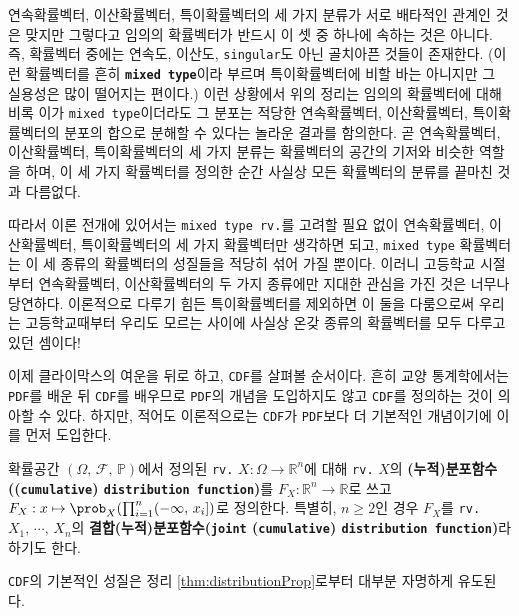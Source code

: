 연속확률벡터, 이산확률벡터, 특이확률벡터의 세 가지 분류가 서로 배타적인 관계인 것은 맞지만 그렇다고 임의의 확률벡터가 반드시 이 셋 중 하나에 속하는 것은 아니다. 즉, 확률벡터 중에는 연속도, 이산도, \texttt{singular}도 아닌 골치아픈 것들이 존재한다. (이런 확률벡터를 흔히 \textbf{\texttt{mixed type}}이라 부르며 특이확률벡터에 비할 바는 아니지만 그 실용성은 많이 떨어지는 편이다.) 이런 상황에서 위의 정리는 임의의 확률벡터에 대해 비록 이가 \texttt{mixed type}이더라도 그 분포는 적당한 연속확률벡터, 이산확률벡터, 특이확률벡터의 분포의 합으로 분해할 수 있다는 놀라운 결과를 함의한다. 곧 연속확률벡터, 이산확률벡터, 특이확률벡터의 세 가지 분류는 확률벡터의 공간의 기저와 비슷한 역할을 하며, 이 세 가지 확률벡터를 정의한 순간 사실상 모든 확률벡터의 분류를 끝마친 것과 다름없다.

따라서 이론 전개에 있어서는 \texttt{mixed type rv.}를 고려할 필요 없이 연속확률벡터, 이산확률벡터, 특이확률벡터의 세 가지 확률벡터만 생각하면 되고, \texttt{mixed type} 확률벡터는 이 세 종류의 확률벡터의 성질들을 적당히 섞어 가질 뿐이다. 이러니 고등학교 시절부터 연속확률벡터, 이산확률벡터의 두 가지 종류에만 지대한 관심을 가진 것은 너무나 당연하다. 이론적으로 다루기 힘든 특이확률벡터를 제외하면 이 둘을 다룸으로써 우리는 고등학교때부터 우리도 모르는 사이에 사실상 온갖 종류의 확률벡터를 모두 다루고 있던 셈이다!

이제 클라이막스의 여운을 뒤로 하고, \texttt{CDF}를 살펴볼 순서이다. 흔히 교양 통계학에서는 \texttt{PDF}를 배운 뒤 \texttt{CDF}를 배우므로 \texttt{PDF}의 개념을 도입하지도 않고 \texttt{CDF}를 정의하는 것이 의아할 수 있다. 하지만, 적어도 이론적으로는 \texttt{CDF}가 \texttt{PDF}보다 더 기본적인 개념이기에 이를 먼저 도입한다.

\begin{definition}
    확률공간 $(\Omega,\,\mathcal{F},\,\mathbb{P})$에서 정의된 \texttt{rv.} $X:\Omega\to\mathbb{R}^n$에 대해 \texttt{rv.} $X$의 \textbf{(누적)분포함수((\texttt{cumulative}) \texttt{distribution function})}를 $F_X:\mathbb{R}^n\to\mathbb{R}$로 쓰고 $F_X:x\mapsto\prob_X(\prod_{i=1}^n(-\infty,\,x_i])$로 정의한다. 특별히, $n\geq2$인 경우 $F_X$를 \texttt{rv.} $X_1,\,\cdots,\,X_n$의 \textbf{결합(누적)분포함수(\texttt{joint} (\texttt{cumulative}) \texttt{distribution function})}라 하기도 한다.
\end{definition}

\texttt{CDF}의 기본적인 성질은 정리 \ref{thm:distributionProp}로부터 대부분 자명하게 유도된다.

